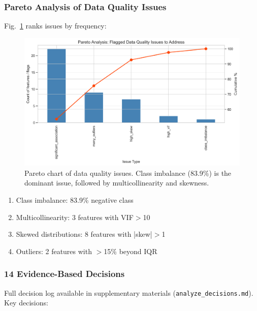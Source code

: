 \documentclass[conference]{IEEEtran}
\begin{document}
\subsubsection{Pareto Analysis of Data Quality Issues}

Fig.~\ref{fig:pareto_issues} ranks issues by frequency:

\begin{figure}[!t]
  \centering
  \includegraphics[width=\linewidth]{pareto_issues.png}
  \caption{Pareto chart of data quality issues. Class imbalance (83.9\%) is the dominant issue, followed by multicollinearity and skewness.}
  \label{fig:pareto_issues}
\end{figure}

\begin{enumerate}
    \item Class imbalance: 83.9\% negative class
    \item Multicollinearity: 3 features with VIF$>$10
    \item Skewed distributions: 8 features with |skew|$>$1
    \item Outliers: 2 features with $>$15\% beyond IQR
\end{enumerate}

\subsubsection{14 Evidence-Based Decisions}

Full decision log available in supplementary materials (\texttt{analyze\_decisions.md}). Key decisions:
\end{document}
